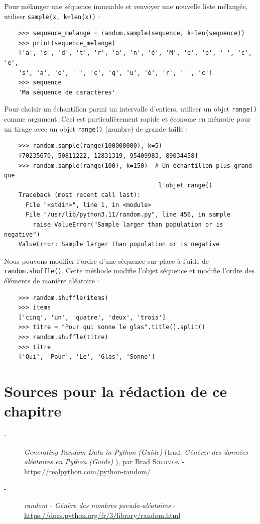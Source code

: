 \documentclass[a4paper,11pt]{book}
\begin{document}
Pour mélanger une séquence immuable et renvoyer une nouvelle liste mélangée, utiliser \texttt{sample(x, k=len(x))} :
\begin{verbatim}
    >>> sequence_melange = random.sample(sequence, k=len(sequence))
    >>> print(sequence_melange)
    ['a', 's', 'd', 't', 'r', 'a', 'n', 'é', 'M', 'e', 'e', ' ', 'c', 'e', 
    's', 'a', 'e', ' ', 'c', 'q', 'u', 'è', 'r', ' ', 'c']
    >>> sequence
    'Ma séquence de caractères'
\end{verbatim}
\medskip
Pour choisir un échantillon parmi un intervalle d'entiers, utiliser un objet \texttt{range()} comme argument. Ceci est particulièrement rapide et économe en mémoire pour un tirage avec un objet \texttt{range()} (nombre) de grande taille :
\begin{verbatim}
    >>> random.sample(range(100000000), k=5)
    [70235670, 50811222, 12831319, 95409983, 89034458]
    >>> random.sample(range(100), k=150)  # Un échantillon plus grand que 
                                           l'objet range()
    Traceback (most recent call last):
      File "<stdin>", line 1, in <module>
      File "/usr/lib/python3.11/random.py", line 456, in sample
        raise ValueError("Sample larger than population or is negative")
    ValueError: Sample larger than population or is negative
\end{verbatim} 
\medskip

Nous pouvons modifier l'ordre d'une séquence sur place à l'aide de \texttt{random.shuffle()}. Cette méthode modifie l'objet séquence et modifie l'ordre des éléments de manière aléatoire :
\begin{verbatim}
    >>> random.shuffle(items)
    >>> items
    ['cinq', 'un', 'quatre', 'deux', 'trois']
    >>> titre = "Pour qui sonne le glas".title().split()
    >>> random.shuffle(titre)
    >>> titre
    ['Qui', 'Pour', 'Le', 'Glas', 'Sonne']
\end{verbatim}
\medskip

\section*{Sources pour la rédaction de ce chapitre}
\begin{description}
	\item[-] \textit{Generating Random Data in Python (Guide)} (trad: \og \textit{Générer des données aléatoires en Python (Guide)} \fg{}), par Brad \textsc{Solomon} - \url{https://realpython.com/python-random/}
	\item[-] \textit{random - Génère des nombres pseudo-aléatoires} - \url{https://docs.python.org/fr/3/library/random.html}
\end{description}
\medskip
\end{document}
